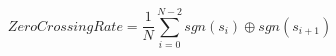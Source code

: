 \begin{equation}
\mathit{Zero Crossing Rate} = \frac{1}{N} \sum_{i=0}^{N-2} sgn(s_i) \oplus sgn(s_{i+1})
\label{eq:zero_crossing_rate}
\end{equation}
